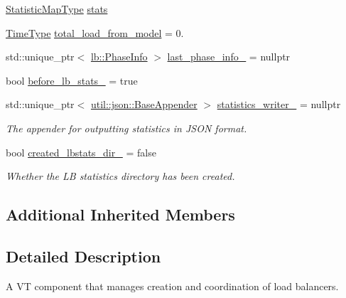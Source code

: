 \begin{DoxyCompactItemize}
\item 
\hyperlink{structvt_1_1vrt_1_1collection_1_1balance_1_1_l_b_manager_a3c6941b9c14a77e015047c659b817a85}{Statistic\+Map\+Type} \hyperlink{structvt_1_1vrt_1_1collection_1_1balance_1_1_l_b_manager_a1cd6e1eace2e827d04679d2a923d7325}{stats}
\item 
\hyperlink{namespacevt_a876a9d0cd5a952859c72de8a46881442}{Time\+Type} \hyperlink{structvt_1_1vrt_1_1collection_1_1balance_1_1_l_b_manager_a7f6bcfd7992bcf0ec01dcb8ed5e0a789}{total\+\_\+load\+\_\+from\+\_\+model} = 0.
\item 
std\+::unique\+\_\+ptr$<$ \hyperlink{structvt_1_1vrt_1_1collection_1_1lb_1_1_phase_info}{lb\+::\+Phase\+Info} $>$ \hyperlink{structvt_1_1vrt_1_1collection_1_1balance_1_1_l_b_manager_ac079e6cb56fedab15d6a776f89cb8e44}{last\+\_\+phase\+\_\+info\+\_\+} = nullptr
\item 
bool \hyperlink{structvt_1_1vrt_1_1collection_1_1balance_1_1_l_b_manager_ad5f6e3a90a443d75ad9df0264d3e9d83}{before\+\_\+lb\+\_\+stats\+\_\+} = true
\item 
std\+::unique\+\_\+ptr$<$ \hyperlink{structvt_1_1util_1_1json_1_1_base_appender}{util\+::json\+::\+Base\+Appender} $>$ \hyperlink{structvt_1_1vrt_1_1collection_1_1balance_1_1_l_b_manager_a6a5c0370df20ab5adb200fb766b03776}{statistics\+\_\+writer\+\_\+} = nullptr
\begin{DoxyCompactList}\small\item\em The appender for outputting statistics in J\+S\+ON format. \end{DoxyCompactList}\item 
bool \hyperlink{structvt_1_1vrt_1_1collection_1_1balance_1_1_l_b_manager_a87cf4beb67cee5dfe49366ce2387cf06}{created\+\_\+lbstats\+\_\+dir\+\_\+} = false
\begin{DoxyCompactList}\small\item\em Whether the LB statistics directory has been created. \end{DoxyCompactList}\end{DoxyCompactItemize}
\subsection*{Additional Inherited Members}


\subsection{Detailed Description}
A VT component that manages creation and coordination of load balancers. 

